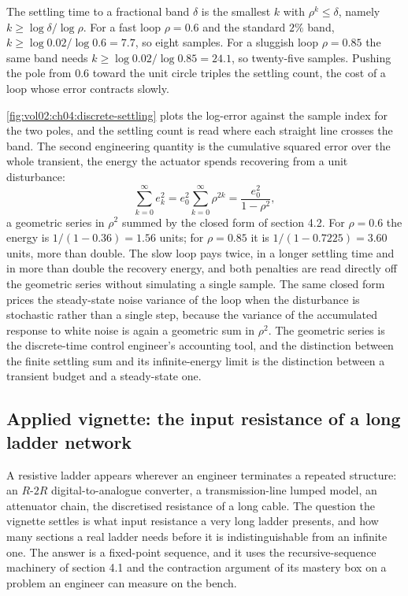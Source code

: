 The settling time to a fractional band $\delta$ is the smallest $k$ with
$\rho^{k} \leq \delta$, namely $k \geq \log\delta / \log\rho$. For a
fast loop $\rho = 0.6$ and the standard $2\%$ band, $k \geq \log 0.02 /
\log 0.6 = 7.7$, so eight samples. For a sluggish loop $\rho = 0.85$ the
same band needs $k \geq \log 0.02 / \log 0.85 = 24.1$, so twenty-five
samples. Pushing the pole from $0.6$ toward the unit circle triples the
settling count, the cost of a loop whose error contracts slowly.



\autoref{fig:vol02:ch04:discrete-settling} plots the log-error against
the sample index for the two poles, and the settling count is read where
each straight line crosses the band. The second engineering quantity is
the cumulative squared error over the whole transient, the energy the
actuator spends recovering from a unit disturbance:
\[
\sum_{k=0}^{\infty} e_{k}^{2} = e_{0}^{2}\sum_{k=0}^{\infty} \rho^{2k}
= \frac{e_{0}^{2}}{1 - \rho^{2}},
\]
a geometric series in $\rho^{2}$ summed by the closed form of section
4.2. For $\rho = 0.6$ the energy is $1/(1 - 0.36) = 1.56$ units; for
$\rho = 0.85$ it is $1/(1 - 0.7225) = 3.60$ units, more than double. The
slow loop pays twice, in a longer settling time and in more than double
the recovery energy, and both penalties are read directly off the
geometric series without simulating a single sample. The same closed
form prices the steady-state noise variance of the loop when the
disturbance is stochastic rather than a single step, because the
variance of the accumulated response to white noise is again a geometric
sum in $\rho^{2}$. The geometric series is the discrete-time control
engineer's accounting tool, and the distinction between the finite
settling sum and its infinite-energy limit is the distinction between a
transient budget and a steady-state one.

\subsection{Applied vignette: the input resistance of a long ladder network}

A resistive ladder appears wherever an engineer terminates a repeated
structure: an $R$-$2R$ digital-to-analogue converter, a transmission-line
lumped model, an attenuator chain, the discretised resistance of a long
cable. The question the vignette settles is what input resistance a very
long ladder presents, and how many sections a real ladder needs before it
is indistinguishable from an infinite one. The answer is a fixed-point
sequence, and it uses the recursive-sequence machinery of section 4.1 and
the contraction argument of its mastery box on a problem an engineer can
measure on the bench.


